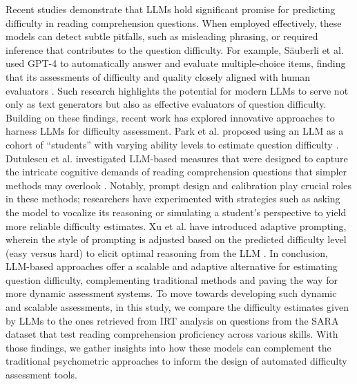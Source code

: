 Recent studies demonstrate that LLMs hold significant promise for predicting difficulty in reading comprehension questions. When employed effectively, these models can detect subtle pitfalls, such as misleading phrasing, or required inference that contributes to the question difficulty. For example, Säuberli et al. used GPT-4 to automatically answer and evaluate multiple-choice items, finding that its assessments of difficulty and quality closely aligned with human evaluators \cite{sauberli2024automatic}. Such research highlights the potential for modern LLMs to serve not only as text generators but also as effective evaluators of question difficulty. Building on these findings, recent work has explored innovative approaches to harness LLMs for difficulty assessment. Park et al. proposed using an LLM as a cohort of ``students'' with varying ability levels to estimate question difficulty \cite{park2024large}. Dutulescu et al. investigated LLM-based measures that were designed to capture the intricate cognitive demands of reading comprehension questions that simpler methods may overlook \cite{dutulescu2024hard}. Notably, prompt design and calibration play crucial roles in these methods; researchers have experimented with strategies such as asking the model to vocalize its reasoning or simulating a student's perspective to yield more reliable difficulty estimates. Xu et al. have introduced adaptive prompting, wherein the style of prompting is adjusted based on the predicted difficulty level (easy versus hard) to elicit optimal reasoning from the LLM \cite{xu2024adaption}. In conclusion, LLM-based approaches offer a scalable and adaptive alternative for estimating question difficulty, complementing traditional methods and paving the way for more dynamic assessment systems. To move towards developing such dynamic and scalable assessments, in this study, we compare the difficulty estimates given by LLMs to the ones retrieved from IRT analysis on questions from the SARA dataset that test reading comprehension proficiency across various skills. With those findings, we gather insights into how these models can complement the traditional psychometric approaches to inform the design of automated difficulty assessment tools.
